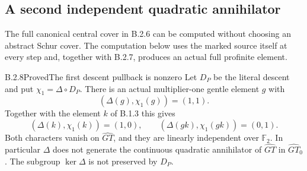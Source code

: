 \subsection{A second independent quadratic annihilator}

The full canonical central cover in B.2.6 can be computed
without choosing an abstract Schur cover.  The computation
below uses the marked source itself at every step and,
together with B.2.7, produces an actual full profinite
element.

\begin{result}{B.2.8}{Proved}{The first descent pullback is nonzero}
Let $D_P$ be the literal descent and put
$\chi_1=\Delta\circ D_P$.  There is an actual multiplier-one
gentle element $g$ with
\[
                       (\Delta(g),\chi_1(g))=(1,1).
                                                        \tag{B.N1}
\]
Together with the element $k$ of B.1.3 this gives
\[
 (\Delta(k),\chi_1(k))=(1,0),\qquad
 (\Delta(gk),\chi_1(gk))=(0,1).                \tag{B.N2}
\]
Both characters vanish on $\widehat{GT}$, and they are
linearly independent over $\mathbb F_2$.  In particular
$\Delta$ does not generate the continuous quadratic
annihilator of $\widehat{GT}$ in $\widehat{GT}_0$.
The subgroup $\ker\Delta$ is not preserved by $D_P$.
\end{result}

